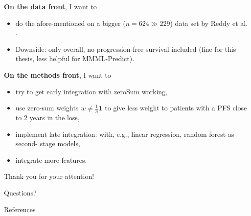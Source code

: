 \documentclass[10pt, aspectratio=169]{beamer}
\begin{document}
\begin{frame}{}
  \textbf{On the data front}, I want to  
  \begin{itemize}
    \item do the afore-mentioned on a \alert{bigger ($n = 624 \gg 229$) data set} by Reddy 
      et al. \autocite{reddy17}. 
    \item Downside: only overall, no progression-free survival included (fine 
      for this thesis, less helpful for MMML-Predict).
  \end{itemize}

  \textbf{On the methods front}, I want to 
  \begin{itemize}
    \item try to get \alert{early integration} with zeroSum working,
    \item use zero-sum weights $w \neq \frac{1}{n} \mathbf{1}$ to give less weight to patients with 
      a PFS close to 2 years in the loss,
    \item implement \alert{late integration}: with, e.g., linear regression, random forest as second-
      stage models,
    \item integrate more features.
  \end{itemize}
\end{frame}

\begin{frame}[standout]
  Thank you for your attention! \par Questions?
\end{frame}

\appendix

\begin{frame}[allowframebreaks]{References}
  \printbibliography
\end{frame}
\end{document}
